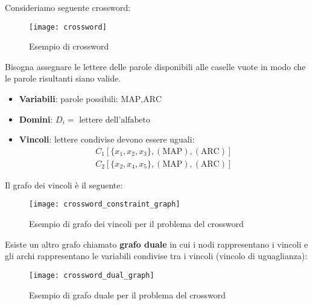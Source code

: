 \documentclass[a4paper]{article}
\begin{document}
\begin{example}
  Consideriamo seguente crossword:
  \begin{figure}[H]
    \centering
    \texttt{[image: crossword]}
    \caption{Esempio di crossword}
  \end{figure}
  \noindent
  Bisogna assegnare le lettere delle parole disponibili alle caselle vuote in modo
  che le parole risultanti siano valide.
  \begin{itemize}
    \item \textbf{Variabili}: parole possibili: \( {\text{MAP}, \text{ARC}} \) 
    \item \textbf{Domini}: \( D_i = \text{ lettere dell'alfabeto} \) 
    \item \textbf{Vincoli}: lettere condivise devono essere uguali:
      \[
        \begin{aligned}
          C_1 \left[ \{x_1, x_2, x_3\}, \left( \text{MAP} \right), \left( \text{ARC} \right) \right]\\
          C_2 \left[ \{x_2, x_4, x_5\}, \left( \text{MAP} \right), \left( \text{ARC} \right) \right]
        \end{aligned}
      \]
  \end{itemize}
  Il grafo dei vincoli è il seguente:
  \begin{figure}[H]
    \centering
    \texttt{[image: crossword\_constraint\_graph]}
    \caption{Esempio di grafo dei vincoli per il problema del crossword}
  \end{figure}
  \noindent
  Esiste un altro grafo chiamato \textbf{grafo duale} in cui i nodi rappresentano
  i vincoli e gli archi rappresentano le variabili condivise tra i vincoli (vincolo di
  uguaglianza):
  \begin{figure}[H]
    \centering
    \texttt{[image: crossword\_dual\_graph]}
    \caption{Esempio di grafo duale per il problema del crossword}
  \end{figure}
\end{example}
\noindent
\end{document}
